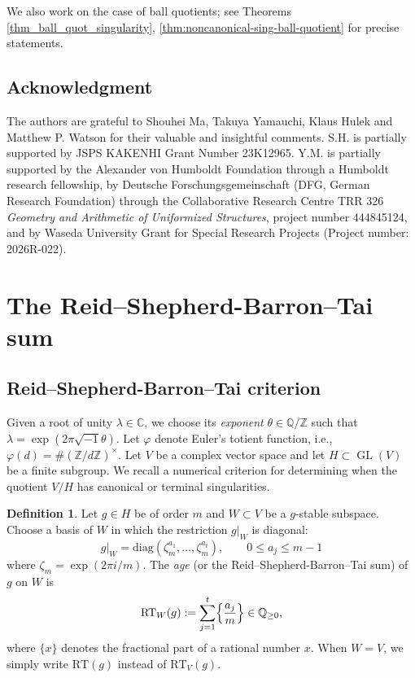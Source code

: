 \documentclass[11pt]{amsart}
\theoremstyle{plain}
\theoremstyle{definition}
\newtheorem{defn}[thm]{Definition}
\numberwithin{equation}{section}
\def\GL{\mathop{\mathrm{GL}}\nolimits}
\def\exp{\mathop{\mathrm{exp}}\nolimits}
\newcommand{\bbC}{\mathbb{C}}
\newcommand{\bbQ}{\mathbb{Q}}
\newcommand{\bbZ}{\mathbb{Z}}
\begin{document}
We also work on the case of ball quotients; see Theorems \ref{thm_ball_quot_singularity}, \ref{thm:noncanonical-sing-ball-quotient} for precise statements.




\subsection*{Acknowledgment}
 The authors are grateful to Shouhei Ma, Takuya Yamauchi, Klaus Hulek and Matthew P. Watson for their valuable and insightful comments. S.H. is partially supported by JSPS KAKENHI Grant Number 23K12965.
Y.M. is partially supported by the Alexander von Humboldt Foundation through a Humboldt research fellowship, by Deutsche Forschungsgemeinschaft (DFG, German Research
Foundation) through the Collaborative Research Centre TRR 326 \emph{Geometry and Arithmetic
of Uniformized Structures}, project number 444845124, and by Waseda University Grant for Special Research Projects (Project number: 2026R-022).

\section{The Reid--Shepherd-Barron--Tai sum}


\subsection{Reid--Shepherd-Barron--Tai criterion}\label{subsec:RT-criterion}
Given a root of unity $\lambda\in\bbC$, we choose its \emph{exponent}
$\theta\in \bbQ/\bbZ$ such that $\lambda=\exp(2\pi\sqrt{-1}\theta)$.
 Let $\varphi$ denote Euler's totient function, i.e., $\varphi(d) = \#(\bbZ/d\bbZ)^\times$.
Let $V$ be a complex vector space and let $H\subset \GL(V)$ be a finite
subgroup. We recall a numerical criterion for determining when the quotient
$V/H$ has canonical or terminal singularities.

\begin{defn}\label{def:age}
  Let $g\in H$ be of order $m$ and $W\subset V$ be a $g$-stable subspace. Choose a basis of $W$ in which the restriction $g|_W$ is diagonal:
  \[
    g|_W=\mathrm{diag}(\zeta_m^{a_1},\dots,\zeta_m^{a_t}),
    \qquad
    0\le a_j\le m-1
  \]
  where $\zeta_m=\exp(2\pi i/m)$.
  The \emph{age} (or the Reid--Shepherd-Barron--Tai sum) of $g$ on $W$ is
  \[
    \mathrm{RT}_W(g):=\sum_{j=1}^t \Bigl\{\frac{a_j}{m}\Bigr\}\in \bbQ_{\ge 0},
  \]
  where $\{x\}$ denotes the fractional part of a rational number $x$.
  When $W=V$, we simply write $\mathrm{RT}(g)$ instead of $\mathrm{RT}_V(g)$.
\end{defn}
\end{document}
